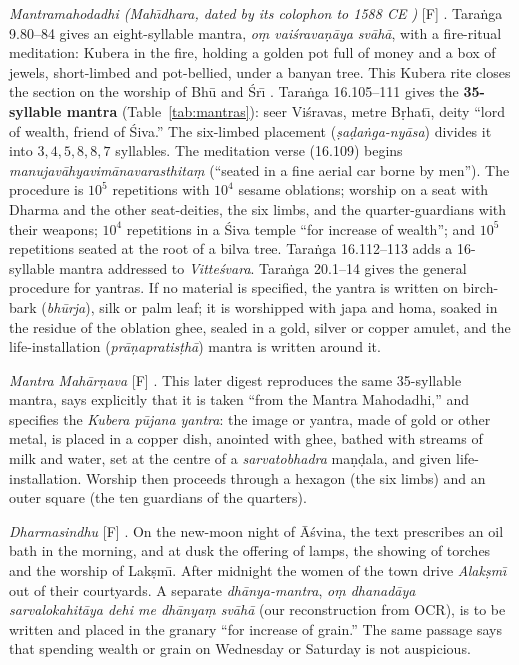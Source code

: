 \documentclass[journal]{IEEEtran}
\theoremstyle{definition}
\newcommand{\Fact}{\textsf{[F]}}
\begin{document}
\emph{Mantramahodadhi (Mah\=\i dhara, dated by its colophon to 1588 CE \cite{buhnemann2000})} \Fact{} \cite{mm1988trans,buhnemann2000}. Taraṅga 9.80--84 gives an eight-syllable mantra, \emph{o\d m vai\'srava\d n\=aya sv\=ah\=a}, with a fire-ritual meditation: Kubera in the fire, holding a golden pot full of money and a box of jewels, short-limbed and pot-bellied, under a banyan tree. This Kubera rite closes the section on the worship of Bh\=u and \'Sr\=\i{} \cite{buhnemann2000}. Taraṅga 16.105--111 gives the \textbf{35-syllable mantra} (Table~\ref{tab:mantras}): seer Vi\'sravas, metre B\d rhat\=\i, deity ``lord of wealth, friend of \'Siva.'' The six-limbed placement (\emph{\d sa\d da\.nga-ny\=asa}) divides it into $3,4,5,8,8,7$ syllables. The meditation verse (16.109) begins \emph{manujav\=ahyavim\=anavarasthita\d m} (``seated in a fine aerial car borne by men''). The procedure is $10^5$ repetitions with $10^4$ sesame oblations; worship on a seat with Dharma and the other seat-deities, the six limbs, and the quarter-guardians with their weapons; $10^4$ repetitions in a \'Siva temple ``for increase of wealth''; and $10^5$ repetitions seated at the root of a bilva tree. Taraṅga 16.112--113 adds a 16-syllable mantra addressed to \emph{Vitte\'svara}. Taraṅga 20.1--14 gives the general procedure for yantras. If no material is specified, the yantra is written on birch-bark (\emph{bh\=urja}), silk or palm leaf; it is worshipped with japa and homa, soaked in the residue of the oblation ghee, sealed in a gold, silver or copper amulet, and the life-installation (\emph{pr\=a\d napratis\d th\=a}) mantra is written around it.

\emph{Mantra Mah\=ar\d nava} \Fact{} \cite{mantramaharnava}. This later digest reproduces the same 35-syllable mantra, says explicitly that it is taken ``from the Mantra Mahodadhi,'' and specifies the \emph{Kubera p\=ujana yantra}: the image or yantra, made of gold or other metal, is placed in a copper dish, anointed with ghee, bathed with streams of milk and water, set at the centre of a \emph{sarvatobhadra} ma\d n\d dala, and given life-installation. Worship then proceeds through a hexagon (the six limbs) and an outer square (the ten guardians of the quarters).

\emph{Dharmasindhu} \Fact{} \cite{dharmasindhu1907}. On the new-moon night of \=A\'svina, the text prescribes an oil bath in the morning, and at dusk the offering of lamps, the showing of torches and the worship of Lak\d sm\=\i{}. After midnight the women of the town drive \emph{Alak\d sm\=\i} out of their courtyards. A separate \emph{dh\=anya-mantra}, \emph{o\d m dhanad\=aya sarvalokahit\=aya dehi me dh\=anya\d m sv\=ah\=a} (our reconstruction from OCR), is to be written and placed in the granary ``for increase of grain.'' The same passage says that spending wealth or grain on Wednesday or Saturday is not auspicious.
\end{document}

